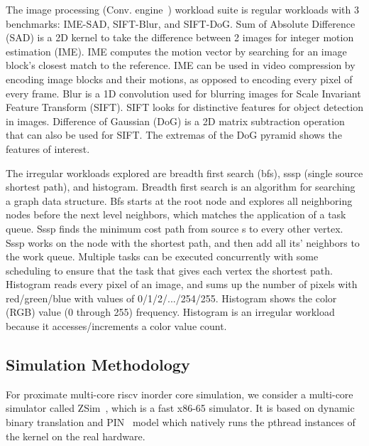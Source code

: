 The image processing (Conv. engine~\cite{convolution_engine}) workload suite is regular workloads with 3 benchmarks: IME-SAD, SIFT-Blur, and SIFT-DoG. 
Sum of Absolute Difference (SAD) is a 2D kernel to take the difference between 2 images for integer motion estimation (IME). 
IME computes the motion vector by searching for an image block’s closest match to the reference. 
IME can be used in video compression by encoding image blocks and their motions, 
as opposed to encoding every pixel of every frame. Blur is a 1D convolution used for 
blurring images for Scale Invariant Feature Transform (SIFT).
SIFT looks for distinctive features for object detection in images. 
Difference of Gaussian (DoG) is a 2D matrix subtraction operation that can also be used for SIFT. 
The extremas of the DoG pyramid shows the features of interest. 

The irregular workloads explored are breadth first search (bfs), sssp (single source shortest path), and histogram. 
Breadth first search is an algorithm for searching a graph data structure. Bfs starts at the root node and 
explores all neighboring nodes before the next level neighbors, which matches the application of a task queue. 
Sssp finds the minimum cost path from source s to every other vertex. Sssp works on the node with the shortest path, 
and then add all its’ neighbors to the work queue.
Multiple tasks can be executed concurrently with some scheduling to ensure that the task that gives each vertex the
shortest path. Histogram reads every pixel of an image, and sums up the number of pixels with red/green/blue with values 
of 0/1/2/.../254/255. Histogram shows the color (RGB) value (0 through 255) frequency. 
Histogram is an irregular workload because it accesses/increments a color value count. 



\subsection{Simulation Methodology} 
For proximate multi-core riscv inorder core simulation, 
we consider a multi-core simulator called ZSim~\cite{sanchez2013zsim}, which is a
fast x86-65 simulator. It is based on dynamic binary translation and PIN~\cite{pin} model which natively 
runs the pthread instances of the kernel on the real hardware.  

